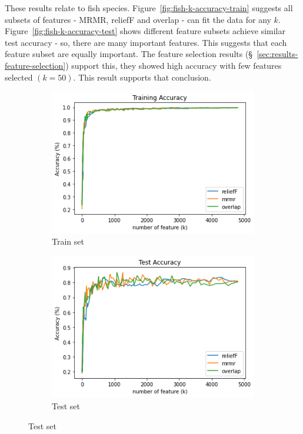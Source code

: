 \documentclass{article}
\begin{document}
These results relate to fish species.
Figure~\ref{fig:fish-k-accuracy-train} suggests all subsets of features - MRMR, reliefF and overlap - can fit the data for any $k$.
Figure~\ref{fig:fish-k-accuracy-test} shows different feature subsets achieve similar test accuracy - so, there are many important features.
This suggests that each feature subset are equally important.
The feature selection results (\S~\ref{sec:results-feature-selection}) support this, they showed high accuracy with few features selected $(k = 50)$.
This result supports that conclusion.

\begin{figure}[htb]
  \centering
  \begin{subfigure}[b]{\linewidth}
    \includegraphics[width=1\linewidth]{part_k_accuracy_train.png}
    \caption{Train set}
    \label{fig:part-k-accuracy-train}
  \end{subfigure}

  \begin{subfigure}[b]{\linewidth}
    \includegraphics[width=1\linewidth]{part_k_accuracy_test.png}
    \caption{Test set}
    \label{fig:part-k-accuracy-test}
  \end{subfigure}


\end{figure}
\end{document}

